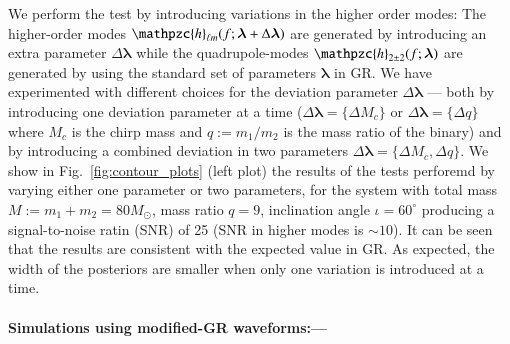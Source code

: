 \documentclass[prl,preprintnumbers,twocolumn,eqsecnum,floatfix,a4paper,nofootinbib,superscriptaddress]{revtex4}
\newcommand{\h}{\mathpzc{h}}
\newcommand{\hlm}{\mathpzc{h}_{\ell m}}
\newcommand{\blambda}{\bm{\lambda}}
\begin{document}
We perform the test by introducing variations in the higher order modes: The higher-order modes $\hlm(f; \blambda+\Delta\blambda)$ are generated by introducing an extra parameter $\Delta\blambda$ while the quadrupole-modes $\h_{2\pm2}(f; \blambda)$ are generated by using the standard set of parameters $\blambda$ in GR. We have experimented with different choices for the deviation parameter $\Delta\blambda$ --- both by introducing one deviation parameter at a time ($\Delta\blambda = \{\Delta M_c\}$ or $\Delta\blambda = \{\Delta q\}$ where $M_c$ is the chirp mass and $q := m_1/m_2$ is the mass ratio of the binary) and by introducing a combined deviation in two parameters $\Delta \blambda = \{\Delta M_c, \Delta q\}$. We show in Fig.~\ref{fig:contour_plots} (left plot) the results of the tests perforemd by varying either one parameter or two parameters, for the system with total mass $M := m_1 + m_2 = 80M_{\odot}$, mass ratio $q=9$, inclination angle $ {\iota}=60^{\circ} $ producing a signal-to-noise ratin  (SNR)  of 25 (SNR in higher modes is $\sim 10$). It can be seen that the results are consistent with the expected value in GR. As expected, the width of the posteriors are smaller when only one variation is introduced at a time. 

\paragraph{Simulations using modified-GR waveforms:---}


\end{document}
